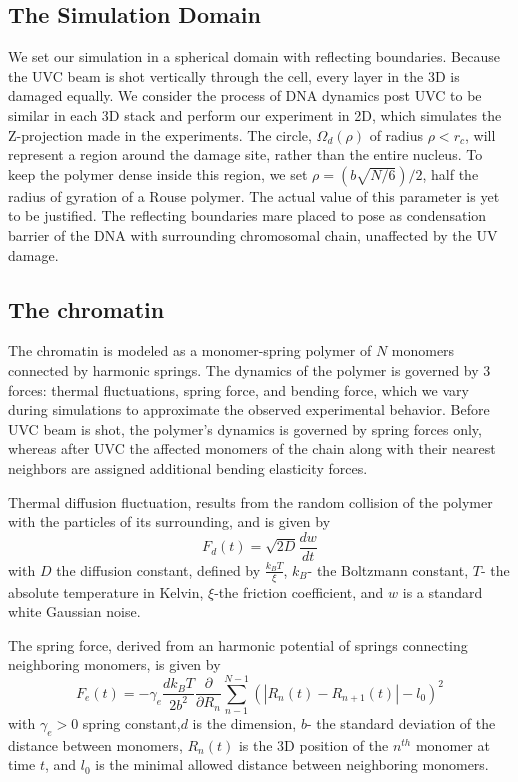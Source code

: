 \documentclass[12pt]{report}
\begin{document}
	\subsection{The Simulation Domain}
	We set our simulation in a spherical domain with reflecting boundaries.
	Because the UVC beam is shot vertically through the cell, every layer in the 3D is damaged equally. We consider the process of DNA dynamics post UVC to be similar in each 3D stack and perform our experiment in 2D, which simulates the Z-projection made in the experiments. The circle, $\Omega_d(\rho)$ of radius $\rho<r_c$, will represent a region around the damage site, rather than the entire nucleus. 
	To keep the polymer dense inside this region, we set $\rho=(b\sqrt{N/6})/2$, half the radius of gyration of a Rouse polymer. The actual value of this parameter is yet to be justified. The reflecting boundaries mare placed to pose as condensation barrier of the DNA with surrounding chromosomal chain, unaffected by the UV damage. 
	
	\subsection{The chromatin}
		The chromatin is modeled as a monomer-spring polymer of $N$ monomers connected by harmonic springs. The dynamics of the polymer is governed by 3 forces: thermal fluctuations, spring force, and bending force, which we vary during simulations to approximate the observed experimental behavior. Before UVC beam is shot, the polymer's dynamics is governed by spring forces only, whereas after UVC the affected monomers of the chain along with their nearest neighbors are assigned additional bending elasticity forces. 
		
		Thermal diffusion fluctuation, results from the random collision of the polymer with the particles of its surrounding, and is given by 
		\begin{equation*}
		F_d(t) = \sqrt{2D}\frac{dw}{dt}
		\end{equation*}
		with $D$ the diffusion constant, defined by $\frac{k_BT}{\xi}$, $k_B$- the Boltzmann constant, $T$- the absolute temperature in Kelvin, $\xi$-the friction coefficient, and $w$ is a standard white Gaussian noise. 
		
		The spring force, derived from an harmonic potential of springs connecting neighboring monomers, is given by
		\begin{equation*}
		F_e(t) = -\gamma_e\frac{dk_BT}{2b^2}\frac{\partial}{\partial R_n}\sum_{n-1}^{N-1}(|R_n(t)-R_{n+1}(t)| -l_0)^2
		\end{equation*}
		with $\gamma_e>0$ spring constant,$d$ is the dimension, $b$- the standard deviation of the distance between monomers, $R_n(t)$ is the 3D position of the $n^{th}$ monomer at time $t$, and $l_0$ is the minimal allowed distance between neighboring monomers.
		
\end{document}
